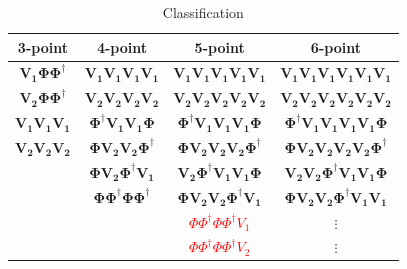 \documentclass[12pt]{article}
\numberwithin{equation}{section}
\begin{document}
\vspace{1em}
\begin{table}[ht]
\centering
\renewcommand{\arraystretch}{1.3}
\setlength{\tabcolsep}{6pt}
\begin{tabular}{|c|c|c|c|}
    \hline
    \textbf{3-point} & \textbf{4-point} & \textbf{5-point} & \textbf{6-point} \\
    \hline
    $\bm{V_1\Phi\Phi^\dagger}$ & $\bm{V_1V_1V_1V_1}$ & $\bm{V_1V_1V_1V_1V_1}$ & $\bm{V_1V_1V_1V_1V_1V_1}$ \\
    $\bm{V_2\Phi\Phi^\dagger}$ & $\bm{V_2V_2V_2V_2}$ & $\bm{V_2V_2V_2V_2V_2}$ & $\bm{V_2V_2V_2V_2V_2V_2}$ \\
    $\bm{V_1V_1V_1}$ & $\bm{\Phi^\dagger V_1V_1\Phi}$ & $\bm{\Phi^\dagger V_1V_1V_1\Phi}$ & $\bm{\Phi^\dagger V_1V_1V_1V_1\Phi}$ \\
    $\bm{V_2V_2V_2}$ & $\bm{\Phi V_2V_2\Phi^\dagger}$ & $\bm{\Phi V_2V_2V_2\Phi^\dagger}$ & $\bm{\Phi V_2V_2V_2V_2\Phi^\dagger}$ \\
     & $\bm{\Phi V_2 \Phi^\dagger V_1}$ & $\bm{V_2\Phi^\dagger V_1V_1\Phi}$ & $\bm{V_2V_2\Phi^\dagger V_1V_1\Phi}$ \\
     & $\bm{\Phi\Phi^\dagger\Phi\Phi^\dagger}$ & $\bm{\Phi V_2V_2\Phi^\dagger V_1}$ & $\bm{\Phi V_2V_2\Phi^\dagger V_1V_1}$ \\
     & & \textcolor{red}{$\Phi\Phi^\dagger\Phi\Phi^\dagger V_1$} & $\vdots$ \\
     & & \textcolor{red}{$\Phi\Phi^\dagger\Phi\Phi^\dagger V_2$} & $\vdots$ \\
    \hline
\end{tabular}
\caption{Classification}
\end{table}
\end{document}
